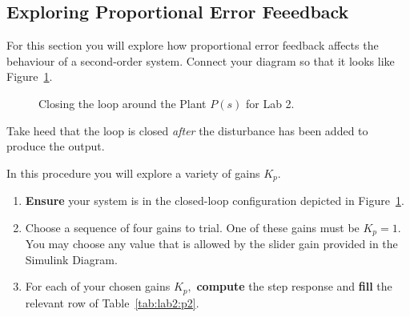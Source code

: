\subsection{Exploring Proportional Error Feeedback}
For this section you will explore how proportional error feedback affects
the behaviour of a second-order system. Connect your diagram so that it
looks like Figure~\ref{fig:lab2:closing-loop}.
%
\begin{figure}
  \centering
  \caption{
    Closing the loop around the Plant \(P(s)\) for Lab 2.
  }
  \label{fig:lab2:closing-loop}
\end{figure}
%
Take heed that the loop is closed \emph{after} the disturbance has been
added to produce the output.
%
\begin{procedure}[label={proc:lab2:p2}]
  In this procedure you will explore a variety of gains \(K_p.\)
  \begin{enumerate}[label=(\arabic*)]
    \item{
      \textbf{Ensure} your system is in the closed-loop configuration
      depicted in Figure~\ref{fig:lab2:closing-loop}.
    }
    \item{
      Choose a sequence of four gains to trial. One of these gains
      must be \(K_p = 1.\) You may choose any value that is allowed by
      the slider gain provided in the Simulink Diagram.
    }
    \item{
      For each of your chosen gains \(K_p,\) \textbf{compute} the step
      response and \textbf{fill} the relevant row of Table~\ref{tab:lab2:p2}.
    }
  \end{enumerate}
\end{procedure}
